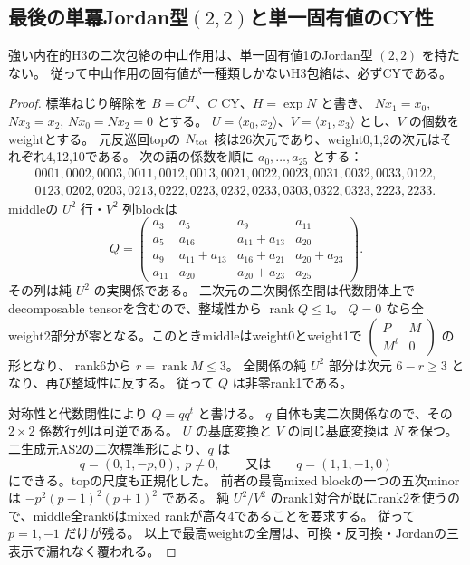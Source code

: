 \subsection{最後の単冪Jordan型\texorpdfstring{$(2,2)$}{(2,2)}と単一固有値のCY性}
\label{subsec:cubic-jordan22-unipotent-vertex}
\begin{theorem}\label{thm:cubic-jordan22-unipotent-empty}
強い内在的H3の二次包絡の中山作用は、単一固有値1のJordan型 $(2,2)$ を持たない。
従って中山作用の固有値が一種類しかないH3包絡は、必ずCYである。
\end{theorem}
\begin{proof}
標準ねじり解除を $B=C^H$、$C$ CY、$H=\exp N$ と書き、
$Nx_1=x_0$, $Nx_3=x_2$, $Nx_0=Nx_2=0$ とする。
$U=\langle x_0,x_2\rangle$、$V=\langle x_1,x_3\rangle$ とし、$V$ の個数をweightとする。
元反巡回topの $N_{\rm tot}$ 核は26次元であり、weight0,1,2の次元はそれぞれ4,12,10である。
次の語の係数を順に $a_0,\ldots,a_{25}$ とする：
\[
\begin{gathered}
0001,0002,0003,0011,0012,0013,0021,0022,0023,0031,0032,0033,0122,\\
0123,0202,0203,0213,0222,0223,0232,0233,0303,0322,0323,2223,2233.
\end{gathered}
\]
middleの $U^2$ 行・$V^2$ 列blockは
\[
 Q=\begin{pmatrix}
 a_3&a_5&a_9&a_{11}\\
 a_5&a_{16}&a_{11}+a_{13}&a_{20}\\
 a_9&a_{11}+a_{13}&a_{16}+a_{21}&a_{20}+a_{23}\\
 a_{11}&a_{20}&a_{20}+a_{23}&a_{25}
 \end{pmatrix}.
\]
その列は純 $U^2$ の実関係である。
二次元の二次関係空間は代数閉体上でdecomposable tensorを含むので、整域性から
$\operatorname{rank}Q\le1$。
$Q=0$ なら全weight2部分が零となる。このときmiddleはweight0とweight1で
$\left(\begin{smallmatrix}P&M\\M^t&0\end{smallmatrix}\right)$ の形となり、
rank6から $r=\operatorname{rank}M\le3$。
全関係の純 $U^2$ 部分は次元 $6-r\ge3$ となり、再び整域性に反する。
従って $Q$ は非零rank1である。

対称性と代数閉性により $Q=qq^t$ と書ける。
$q$ 自体も実二次関係なので、その $2\times2$ 係数行列は可逆である。
$U$ の基底変換と $V$ の同じ基底変換は $N$ を保つ。
二生成元AS2の二次標準形により、$q$ は
\[
 q=(0,1,-p,0),\ p\ne0,\qquad\text{又は}\qquad q=(1,1,-1,0)
\]
にできる。topの尺度も正規化した。
前者の最高mixed blockの一つの五次minorは
$-p^2(p-1)^2(p+1)^2$ である。
純 $U^2/V^2$ のrank1対合が既にrank2を使うので、middle全rank6はmixed rankが高々4であることを要求する。
従って $p=1,-1$ だけが残る。
以上で最高weightの全層は、可換・反可換・Jordanの三表示で漏れなく覆われる。


\end{proof}
